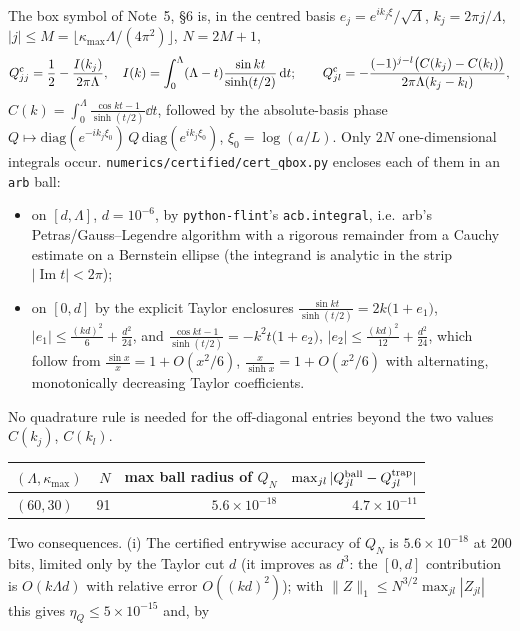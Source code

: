 \documentclass[11pt]{article}
\begin{document}
The box symbol of Note~5, \S6 is, in the centred basis $e_j=e^{ik_j\xi}/\sqrt\Lambda$,
$k_j=2\pi j/\Lambda$, $|j|\le M=\lfloor\kappa_{\max}\Lambda/(4\pi^2)\rfloor$, $N=2M+1$,
\begin{equation}\label{eq:Qbox}
 Q^{\rm c}_{jj}=\frac12-\frac{I(k_j)}{2\pi\Lambda},\quad
 I(k)=\int_0^\Lambda(\Lambda-t)\frac{\sin kt}{\sinh(t/2)}\,\mathrm d t;\qquad
 Q^{\rm c}_{jl}=-\frac{(-1)^{j-l}\bigl(C(k_j)-C(k_l)\bigr)}{2\pi\Lambda(k_j-k_l)},
\end{equation}
$C(k)=\int_0^\Lambda\frac{\cos kt-1}{\sinh(t/2)}\dd t$, followed by the absolute-basis phase
$Q\mapsto\mathrm{diag}(e^{-ik_j\xi_0})\,Q\,\mathrm{diag}(e^{ik_j\xi_0})$, $\xi_0=\log(a/L)$.
Only $2N$ one-dimensional integrals occur.  \texttt{numerics/certified/cert\_qbox.py} encloses each
of them in an \texttt{arb} ball:
\begin{itemize}[leftmargin=1.6em]
\item on $[d,\Lambda]$, $d=10^{-6}$, by \texttt{python-flint}'s \texttt{acb.integral}, i.e.\ arb's
 Petras/Gauss--Legendre algorithm with a rigorous remainder from a Cauchy estimate on a Bernstein
 ellipse (the integrand is analytic in the strip $|\operatorname{Im}t|<2\pi$);
\item on $[0,d]$ by the explicit Taylor enclosures
 $\frac{\sin kt}{\sinh(t/2)}=2k\bigl(1+e_1\bigr)$, $|e_1|\le\frac{(kd)^2}6+\frac{d^2}{24}$, and
 $\frac{\cos kt-1}{\sinh(t/2)}=-k^2t\bigl(1+e_2\bigr)$, $|e_2|\le\frac{(kd)^2}{12}+\frac{d^2}{24}$,
 which follow from $\frac{\sin x}x=1+O(x^2/6)$, $\frac{x}{\sinh x}=1+O(x^2/6)$ with alternating,
 monotonically decreasing Taylor coefficients.
\end{itemize}
No quadrature rule is needed for the off-diagonal entries beyond the two values $C(k_j)$, $C(k_l)$.
\begin{center}\small
\begin{tabular}{l r r r}\toprule
$(\Lambda,\kappa_{\max})$ & $N$ & max ball radius of $Q_N$ & $\max_{jl}|Q^{\rm ball}_{jl}-Q^{\rm trap}_{jl}|$\\\midrule
$(60,30)$ & 91 & $5.6\times10^{-18}$ & $4.7\times10^{-11}$\\
\bottomrule\end{tabular}
\end{center}
Two consequences.  (i) The certified entrywise accuracy of $Q_N$ is $5.6\times10^{-18}$ at
$200$ bits, limited only by the Taylor cut $d$ (it improves as $d^3$: the $[0,d]$ contribution is $O(k\Lambda d)$ with relative error $O((kd)^2)$); with
$\|Z\|_1\le N^{3/2}\max_{jl}|Z_{jl}|$ this gives $\eta_Q\le5\times10^{-15}$ and, by
\end{document}
